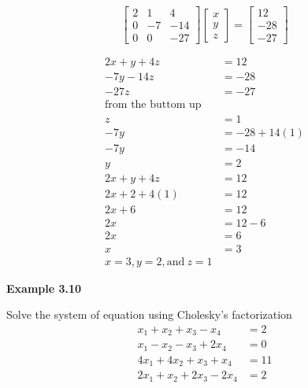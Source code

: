 \documentclass[a4paper, 12pt]{report}
\begin{document}
{\begin{equation*}
\begin{bmatrix}
2& 1& 4\\
0& -7& -14\\
0& 0& -27
\end{bmatrix}
\begin{bmatrix}
x\\ y\\ z
\end{bmatrix}
=
\begin{bmatrix}
12\\ -28\\ -27
\end{bmatrix}
\end{equation*}

\begin{align*}
2x+y+4z&=12\\
-7y-14z&=-28\\
-27z&=-27\\
\text{from the buttom up}\\
z&=1\\
-7y&=-28+14(1)\\
-7y&=-14\\
y&=2\\
2x+y+4z&=12\\
2x+2+4(1)&=12\\
2x+6&=12\\
2x&=12-6\\
2x&=6\\
x&=3\\
x=3, y=2, \text{and}\ z=1
\end{align*}

\begin{center}
	\textbf{Example 3.10}
\end{center}
Solve the system of equation using Cholesky's factorization
\begin{align*}
x_1+x_2+x_3-x_4&=2\\
x_1-x_2-x_3+2x_4&=0\\
4x_1+4x_2+x_3+x_4&=11\\
2x_1+x_2+2x_3-2x_4&=2
\end{align*}

}
\end{document}
